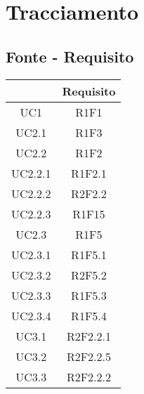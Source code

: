 \section{Tracciamento} \label{section: tracciamento}

\subsection{Fonte - Requisito}\label{subsection: fonti}

\begin{table}[H]
	\centering
	\renewcommand{\arraystretch}{1.8}
	\begin{tabular}{c | c}
		\rowcolor[HTML]{125E28}
		\multicolumn{1}{c}{\color[HTML]{FFFFFF} \textbf{Fonte}} &
		\multicolumn{1}{c}{\color[HTML]{FFFFFF} \textbf{Requisito}}              \\
		\hline
		UC1                                                     & R1F1           \\ \hline
		UC2.1                                                   & R1F3           \\ \hline
		UC2.2                                                   & R1F2           \\ \hline
		UC2.2.1                                                 & R1F2.1         \\ \hline
		UC2.2.2                                                 & R2F2.2         \\ \hline
		UC2.2.3                                                 & R1F15          \\ \hline
		UC2.3                                                   & R1F5           \\ \hline
		UC2.3.1                                                 & R1F5.1         \\ \hline
		UC2.3.2                                                 & R2F5.2         \\ \hline
		UC2.3.3                                                 & R1F5.3         \\ \hline
		UC2.3.4                                                 & R1F5.4         \\ \hline
		UC3.1                                                   & R2F2.2.1       \\ \hline
		UC3.2                                                   & R2F2.2.5       \\ \hline
		UC3.3                                                   & R2F2.2.2       \\ \hline

\end{tabular}
\end{table}
